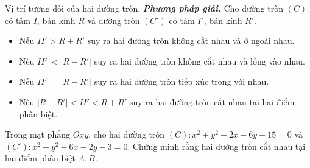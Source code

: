\begin{dang}{Vị trí tương đối của hai đường tròn.}
	\textbf{\textit{Phương pháp giải.}}
	Cho đường tròn $(C)$ có tâm $I$, bán kính $R$ và đường tròn $\left(C'\right)$ có tâm $I'$, bán kính $R'$.
	\begin{itemize}
		\item  Nếu $II' > R+R'$ suy ra hai đường tròn không cắt nhau và ở ngoài nhau. 
		\item Nếu $II'~ < \left| R-R'\right|$ suy ra hai đường tròn không cắt nhau và lồng vào nhau.
		\item Nếu $II'~=\left| R-R'\right|$ suy ra hai đường tròn tiếp xúc trong với nhau.
		\item Nếu $\left| R-R'\right| < II' < R+R'$ suy ra hai đường tròn cắt nhau tại hai điểm phân biệt.
	\end{itemize}
\end{dang}
\begin{vd}
	Trong mặt phẳng $Oxy$, cho hai đường tròn $(C)\colon x^2+y^2-2x-6y-15=0$ và $(C') \colon x^2+y^2-6x-2y-3=0$. Chứng minh rằng hai đường tròn cắt nhau tại hai điểm phân biệt $A, B$.
\end{vd}
